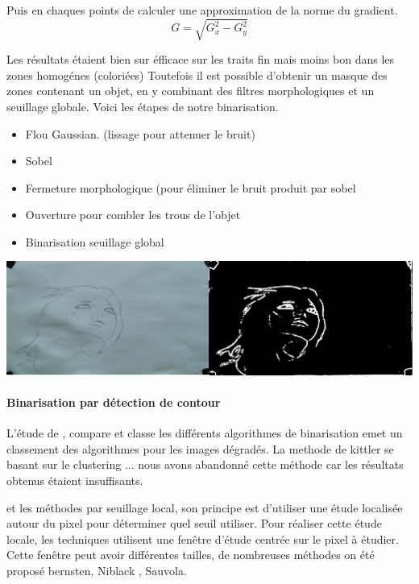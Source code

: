Puis en chaques points de calculer une approximation de la norme du gradient. 
\[ G = \sqrt{G_x^2 - G_y^2} \]


Les résultats étaient bien sur éfficace sur les traits fin mais moins bon dans les zones homogénes (coloriées)
Toutefois il est possible d'obtenir un masque des zones contenant un objet, en y combinant des filtres morphologiques et un seuillage globale.
Voici les étapes de notre binarisation.

\begin{itemize}
   \item Flou Gaussian. (lissage pour attenuer le bruit) 
   \item Sobel
   \item Fermeture morphologique (pour éliminer le bruit produit par sobel 
   \item Ouverture pour combler les trous de l'objet 
   \item Binarisation seuillage global
\end{itemize} 

\begin{center}
\includegraphics[width=\textwidth]{images/sobelComp.png}
\end{center}


\paragraph{Binarisation par détection de contour\vspace{0.5cm}\\}


L'étude de , compare et classe les différents algorithmes de binarisation emet un classement des algorithmes pour les images dégradés.
La methode de kittler se basant sur le clustering ... nous avons abandonné cette méthode car les résultats obtenus étaient insuffisants.

et les méthodes par seuillage local, son principe est d’utiliser une étude localisée autour du pixel pour déterminer quel seuil utiliser. Pour réaliser cette étude locale, les techniques utilisent une fenêtre d’étude centrée sur le pixel à étudier. Cette fenêtre peut avoir différentes tailles, de nombreuses méthodes on été proposé bernsten, Niblack , Sauvola.

